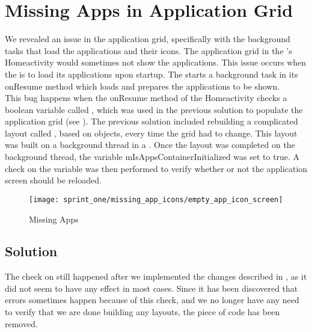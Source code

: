 
\section{Missing Apps in Application Grid}
\label{sec:missing_apps_racecondition}

We revealed an issue in the application grid, specifically with the background tasks that load the applications and their icons. The application grid in the \launcher's Homeactivity would sometimes not show the applications. This issue occurs when the \launcher is to load its applications upon startup. The \launcher starts a background task in its onResume method which loads and prepares the applications to be shown.\\

This bug happens when the onResume method of the Homeactivity checks a boolean variable called , which was used in the previous solution to populate the application grid (see ). The previous solution included rebuilding a complicated layout called , based on  objects, every time the grid had to change. This layout was built on a background thread in a . Once the layout was completed on the background thread, the variable mIsAppsContainerInitialized was set to true. A check on the variable was then performed to verify whether or not the application screen should be reloaded.

\begin{figure}[!htbp]
    \centering
    \texttt{[image: sprint\_one/missing\_app\_icons/empty\_app\_icon\_screen]}
    \caption{Missing Apps}
    \label{fig:missing_apps}
\end{figure}

\subsection{Solution}
\label{sub:missing_apps_racecondition_solution}

The check on  still happened after we implemented the changes described in , as it did not seem to have any effect in most cases. Since it has been discovered that errors sometimes happen because of this check, and we no longer have any need to verify that we are done building any layouts, the piece of code has been removed. 